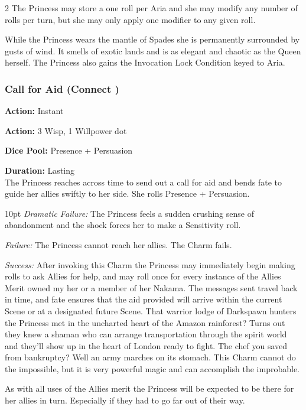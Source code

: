 \begin{multicols}{2}
The Princess may store a one roll per Aria and she may modify any number of rolls per turn, but she may only apply one modifier to any given roll. 

While the Princess wears the mantle of Spades she is permanently surrounded by gusts of wind. It smells of exotic lands and is as elegant and chaotic as the Queen herself. The Princess also gains the Invocation Lock Condition keyed to Aria.

\subsubsection*{Call for Aid (Connect \textbullet\textbullet\textbullet\textbullet\textbullet)}

\noindent \textbf{Action:} Instant

\noindent \textbf{Action:} 3 Wisp, 1 Willpower dot

\noindent \textbf{Dice Pool:} Presence + Persuasion

\noindent \textbf{Duration:} Lasting \\

\noindent The Princess reaches across time to send out a call for aid and bends fate to guide her allies swiftly to her side. She rolls Presence + Persuasion.

\begin{myindentpar}{10pt}    \emph{Dramatic Failure:} The Princess feels a sudden crushing sense of abandonment and the shock forces her to make a Sensitivity roll. 

    \emph{Failure:} The Princess cannot reach her allies. The Charm fails.

    \emph{Success:} After invoking this Charm the Princess may immediately begin making rolls to ask Allies for help, and may roll once for every instance of the Allies Merit owned my her or a member of her Nakama. The messages sent travel back in time, and fate ensures that the aid provided will arrive within the current Scene or at a designated future Scene. That warrior lodge of Darkspawn hunters the Princess met in the uncharted heart of the Amazon rainforest? Turns out they knew a shaman who can arrange transportation through the spirit world and they'll show up in the heart of London ready to fight. The chef you saved from bankruptcy? Well an army marches on its stomach. This Charm cannot do the impossible, but it is very powerful magic and can accomplish the improbable. 
	
	As with all uses of the Allies merit the Princess will be expected to be there for her allies in turn. Especially if they had to go far out of their way. 


\end{myindentpar}
\end{multicols}
